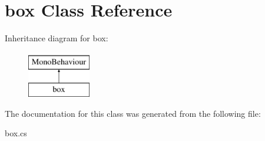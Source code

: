 \hypertarget{classbox}{}\section{box Class Reference}
\label{classbox}
Inheritance diagram for box\+:\begin{figure}[H]
\begin{center}
\leavevmode
\includegraphics[height=2.000000cm]{classbox}
\end{center}
\end{figure}


The documentation for this class was generated from the following file\+:\begin{DoxyCompactItemize}
\item 
box.\+cs\end{DoxyCompactItemize}

